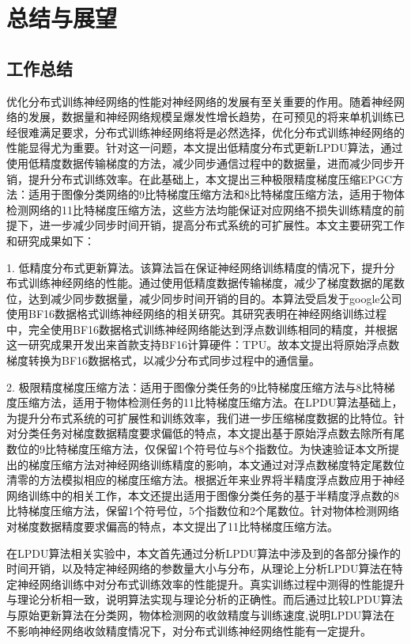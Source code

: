 \chapter{总结与展望}
\section{工作总结}
优化分布式训练神经网络的性能对神经网络的发展有至关重要的作用。随着神经网络的发展，数据量和神经网络规模呈爆发性增长趋势，在可预见的将来单机训练已经很难满足要求，分布式训练神经网络将是必然选择，优化分布式训练神经网络的性能显得尤为重要。针对这一问题，本文提出低精度分布式更新LPDU算法，通过使用低精度数据传输梯度的方法，减少同步通信过程中的数据量，进而减少同步开销，提升分布式训练效率。在此基础上，本文提出三种极限精度梯度压缩EPGC方法：适用于图像分类网络的9比特梯度压缩方法和8比特梯度压缩方法，适用于物体检测网络的11比特梯度压缩方法，这些方法均能保证对应网络不损失训练精度的前提下，进一步减少同步时间开销，提高分布式系统的可扩展性。本文主要研究工作和研究成果如下：

1. 低精度分布式更新算法。该算法旨在保证神经网络训练精度的情况下，提升分布式训练神经网络的性能。通过使用低精度数据传输梯度，减少了梯度数据的尾数位，达到减少同步数据量，减少同步时间开销的目的。本算法受启发于google公司使用BF16数据格式训练神经网络的相关研究。其研究表明在神经网络训练过程中，完全使用BF16数据格式训练神经网络能达到浮点数训练相同的精度，并根据这一研究成果开发出来首款支持BF16计算硬件：TPU。故本文提出将原始浮点数梯度转换为BF16数据格式，以减少分布式同步过程中的通信量。

2. 极限精度梯度压缩方法：适用于图像分类任务的9比特梯度压缩方法与8比特梯度压缩方法，适用于物体检测任务的11比特梯度压缩方法。在LPDU算法基础上，为提升分布式系统的可扩展性和训练效率，我们进一步压缩梯度数据的比特位。针对分类任务对梯度数据精度要求偏低的特点，本文提出基于原始浮点数去除所有尾数位的9比特梯度压缩方法，仅保留1个符号位与8个指数位。为快速验证本文所提出的梯度压缩方法对神经网络训练精度的影响，本文通过对浮点数梯度特定尾数位清零的方法模拟相应的梯度压缩方法。根据近年来业界将半精度浮点数应用于神经网络训练中的相关工作，本文还提出适用于图像分类任务的基于半精度浮点数的8比特梯度压缩方法，保留1个符号位，5个指数位和2个尾数位。针对物体检测网络对梯度数据精度要求偏高的特点，本文提出了11比特梯度压缩方法。

在LPDU算法相关实验中，本文首先通过分析LPDU算法中涉及到的各部分操作的时间开销，以及特定神经网络的参数量大小与分布，从理论上分析LPDU算法在特定神经网络训练中对分布式训练效率的性能提升。真实训练过程中测得的性能提升与理论分析相一致，说明算法实现与理论分析的正确性。而后通过比较LPDU算法与原始更新算法在分类网，物体检测网的收敛精度与训练速度,说明LPDU算法在不影响神经网络收敛精度情况下，对分布式训练神经网络性能有一定提升。


